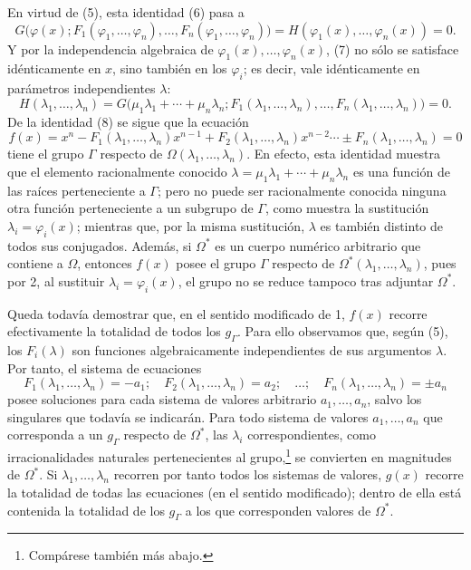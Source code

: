 \documentclass[11pt]{article}
\begin{document}
En virtud de (5), esta identidad (6) pasa a
\begin{equation}\tag{7}
G\bigl(\varphi(x);F_1(\varphi_1,
\ldots,\varphi_n),\ldots,F_n(\varphi_1,
\ldots,\varphi_n)\bigr)
=H(\varphi_1(x),\ldots,\varphi_n(x))=0.
\end{equation}
Y por la independencia algebraica de $\varphi_1(x),\ldots,\varphi_n(x)$, (7) no sólo se satisface idénticamente en $x$, sino también en los $\varphi_i$; es decir, vale idénticamente en parámetros independientes $\lambda$:
\begin{equation}\tag{8}
H(\lambda_1,
\ldots,\lambda_n)=G\bigl(\mu_1\lambda_1+\cdots+\mu_n\lambda_n;
F_1(\lambda_1,
\ldots,\lambda_n),\ldots,F_n(\lambda_1,
\ldots,\lambda_n)\bigr)=0.
\end{equation}
De la identidad (8) se sigue que la ecuación
\begin{equation}\tag{9}
f(x)=x^n-F_1(\lambda_1,
\ldots,\lambda_n)x^{n-1}+F_2(\lambda_1,
\ldots,\lambda_n)x^{n-2}\cdots \pm F_n(\lambda_1,
\ldots,\lambda_n)=0
\end{equation}
tiene el grupo $\Gamma$ respecto de $\Omega(\lambda_1,
\ldots,\lambda_n)$. En efecto, esta identidad muestra que el elemento racionalmente conocido $\lambda=\mu_1\lambda_1+
\cdots+
\mu_n\lambda_n$ es una función de las raíces perteneciente a $\Gamma$; pero no puede ser racionalmente conocida ninguna otra función perteneciente a un subgrupo de $\Gamma$, como muestra la sustitución $\lambda_i=\varphi_i(x)$; mientras que, por la misma sustitución, $\lambda$ es también distinto de todos sus conjugados. Además, si $\Omega^*$ es un cuerpo numérico arbitrario que contiene a $\Omega$, entonces $f(x)$ posee el grupo $\Gamma$ respecto de $\Omega^*(\lambda_1,
\ldots,\lambda_n)$, pues por 2, al sustituir $\lambda_i=\varphi_i(x)$, el grupo no se reduce tampoco tras adjuntar $\Omega^*$.

Queda todavía demostrar que, en el sentido modificado de 1, $f(x)$ recorre efectivamente la totalidad de todos los $g_\Gamma$. Para ello observamos que, según (5), los $F_i(\lambda)$ son funciones algebraicamente independientes de sus argumentos $\lambda$. Por tanto, el sistema de ecuaciones
\begin{equation}\tag{10}
F_1(\lambda_1,
\ldots,\lambda_n)=-a_1;\quad F_2(\lambda_1,
\ldots,\lambda_n)=a_2;\quad\ldots;\quad F_n(\lambda_1,
\ldots,\lambda_n)=\pm a_n
\end{equation}
posee soluciones para cada sistema de valores arbitrario $a_1,
\ldots,a_n$, salvo los singulares que todavía se indicarán. Para todo sistema de valores $a_1,
\ldots,a_n$ que corresponda a un $g_\Gamma$ respecto de $\Omega^*$, las $\lambda_i$ correspondientes, como irracionalidades naturales pertenecientes al grupo,\footnote{Compárese también más abajo.} se convierten en magnitudes de $\Omega^*$. Si $\lambda_1,
\ldots,\lambda_n$ recorren por tanto todos los sistemas de valores, $g(x)$ recorre la totalidad de todas las ecuaciones (en el sentido modificado); dentro de ella está contenida la totalidad de los $g_\Gamma$ a los que corresponden valores de $\Omega^*$.
\end{document}
